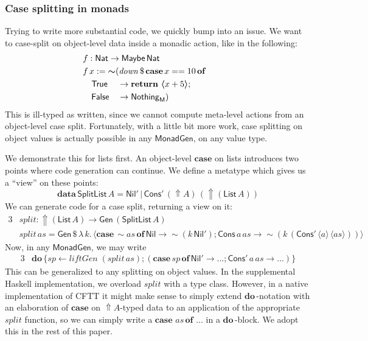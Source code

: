 \documentclass[acmsmall,screen,review,anonymous]{acmart}
\newcommand{\mit}[1]{\mathit{#1}}
\newcommand{\msf}[1]{\mathsf{#1}}
\newcommand{\mbf}[1]{\mathbf{#1}}
\newcommand{\bs}[1]{\boldsymbol{#1}}
\newcommand{\mdo}{\mbf{do}\,}
\newcommand{\ind}{\hspace{1em}}
\newcommand{\return}{\mbf{return}\,}
\newcommand{\lam}{\lambda\,}
\newcommand{\data}{\mbf{data}\,}
\newcommand{\M}{\msf{M}}
\newcommand{\of}{\mbf{of}\,}
\newcommand{\vas}{\mit{as}}
\newcommand{\List}{\msf{List}}
\newcommand{\Nil}{\msf{Nil}}
\newcommand{\Cons}{\msf{Cons}}
\newcommand{\fro}{\leftarrow}
\newcommand{\case}{\mbf{case\,}}
\newcommand{\Up}{{\Uparrow}}
\newcommand{\spl}{{\bs{\sim}}}
\newcommand{\ql}{{\bs{\langle}}}
\newcommand{\qr}{{\bs{\rangle}}}
\newcommand{\True}{\msf{True}}
\newcommand{\False}{\msf{False}}
\newcommand{\Nat}{\msf{Nat}}
\newcommand{\Maybe}{\msf{Maybe}}
\newcommand{\Nothing}{\msf{Nothing}}
\theoremstyle{remark}
\newcommand{\mdown}{\mit{down}}
\newcommand{\Gen}{\msf{Gen}}
\newcommand{\qt}[1]{\ql#1\qr}
\newcommand{\liftGen}{\mit{liftGen}}
\newcommand{\MonadGen}{\msf{MonadGen}}
\newcommand{\dlr}{\,\$\,}
\begin{document}
\subsubsection{Case splitting in monads}
Trying to write more substantial code, we quickly bump into an issue. We
want to case-split on object-level data inside a monadic action, like in the following:
\begin{alignat*}{3}
  & \hspace{-4em}\mathrlap{f : \Nat \to \Maybe\,\Nat}\\
  & \hspace{-4em}\mathrlap{f\,x := \spl(\mdown\,\$\, \case x == 10\,\of}\\
  & \hspace{-4em}\ind \True  &&\to \return\,\qt{x + 5};\\
  & \hspace{-4em}\ind \False &&\to \Nothing_\M)
\end{alignat*}
This is ill-typed as written, since we cannot compute meta-level actions from an
object-level case split. Fortunately, with a little bit more work, case
splitting on object values is actually possible in any $\MonadGen$, on any value
type.

We demonstrate this for lists first. An object-level $\mbf{case}$ on lists introduces
two points where code generation can continue. We define a metatype which gives
us a ``view'' on these points:
\[ \data \msf{SplitList}\,A = \Nil'\,|\,\Cons'\,(\Up A)\,(\Up (\List\,A)) \]
We can generate code for a case split, returning a view on it:
\begin{alignat*}{3}
  &\mit{split} : \Up (\List\,A) \to \Gen\,(\msf{SplitList}\,A)\\
  &\mit{split}\,\vas = \Gen \dlr \lam k.\,\qt{\case \spl \vas\,\of \Nil \to \spl(k\,\Nil'); \Cons\,a\,\vas \to \spl(k\,(\Cons'\,\qt{a}\,\qt{\vas}))}
\end{alignat*}
Now, in any $\MonadGen$, we may write
\begin{alignat*}{3}
  &\mdo \{\mit{sp} \fro \liftGen\;(\!\mit{split}\,\vas);(\case \mit{sp}\,\of \Nil' \to ...;\Cons'\,a\,\vas \to ...)\}
\end{alignat*}
This can be generalized to any splitting on object values. In the supplemental
Haskell implementation, we overload $\mit{split}$ with a type class. However, in
a native implementation of CFTT it might make sense to simply extend
$\mdo$-notation with an elaboration of $\mbf{case}$ on $\Up A$-typed data to an
application of the appropriate $\mit{split}$ function, so we can simply write a
$\case\,\vas\,\of\,...$ in a $\mdo$-block. We adopt this in the rest of this
paper.
\end{document}
